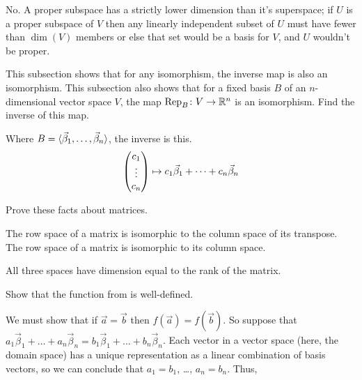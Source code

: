 \begin{exercises}
    \begin{answer}
      No.
      A proper subspace has a strictly lower dimension than it's superspace;
      if $U$ is a proper subspace of $V$ then any linearly independent subset 
      of $U$ must have fewer than $\dim(V)$ members or else that set would
      be a basis for $V$, and $U$ wouldn't be proper.  
    \end{answer}
  \recommended \item 
    This subsection shows that for any isomorphism, the inverse map is
    also an isomorphism.
    This subsection also shows that for a fixed basis \( B \) of an
    \( n \)-dimensional vector space \( V \), the map
    \( \mbox{$\text{Rep}_B\colon V\to \mathbb{R}^n$} \) is an isomorphism.
    Find the inverse of this map.
    \begin{answer}
      Where \( B=\langle\vec{\beta}_1,\ldots,\vec{\beta}_n\rangle \), the
      inverse is this.
      \begin{equation*}
        \begin{pmatrix} c_1 \\ \vdots \\ c_n \end{pmatrix}
        \mapsto c_1\vec{\beta}_1+\cdots+c_n\vec{\beta}_n
      \end{equation*}  
    \end{answer}
  \recommended \item 
    Prove these facts about matrices.
    \begin{exparts}
      \partsitem The row space of a matrix is isomorphic to the 
        column space of its transpose.
      \partsitem The row space of a matrix is isomorphic to its column space.
    \end{exparts}
    \begin{answer}
      All three spaces have dimension equal to the rank of the matrix.
    \end{answer}
  \item \label{exer:FcnWellDef}
    Show that the function from 
    is well-defined.
     \begin{answer}
        We must show that if \( \vec{a}=\vec{b} \) then
        \( f(\vec{a})=f(\vec{b}) \).
        So suppose that 
        $a_1\vec{\beta}_1+\dots+a_n\vec{\beta}_n
           =b_1\vec{\beta}_1+\dots+b_n\vec{\beta}_n$.
        Each vector in a vector space (here, the domain space)
        has a unique representation as a linear combination
        of basis vectors, so we can conclude that \( a_1=b_1 \), \ldots,
        \(a_n=b_n \). 
        Thus,
        \begin{equation*}

\end{equation*}
\end{answer}
\end{exercises}
